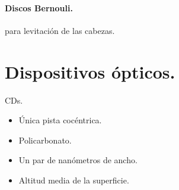 \paragraph{Discos Bernouli.} para levitaci\'{o}n de las cabezas.
\section{Dispositivos \'{o}pticos.}
CDs.
\begin{itemize}
	\item \'{U}nica pista coc\'{e}ntrica.
	\item Policarbonato.
	\item Un par de nan\'{o}metros de ancho.
	\item Altitud media de la superficie.
\end{itemize}
